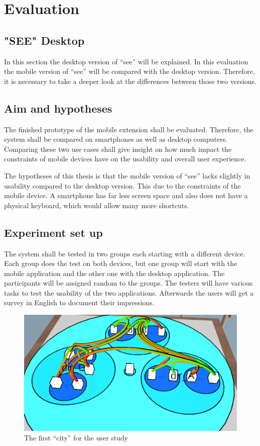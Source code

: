 \section{Evaluation}

\subsection{"SEE" Desktop}
In this section the desktop version of \enquote{\gls{see}} will be explained. 
In this evaluation the mobile version of \enquote{\gls{see}} will be compared with the desktop version.
Therefore, it is necessary to take a deeper look at the differences between those two versions.

\subsection{Aim and hypotheses}
The finished prototype of the mobile extension shall be evaluated. 
Therefore, the system shall be compared on smartphones as well as desktop computers. 
Comparing these two use cases shall give insight on how much impact the constraints of mobile devices have on the usability and overall user experience.

The hypotheses of this thesis is that the mobile version of \enquote{\gls{see}} lacks slightly in usability compared to the desktop version.
This due to the constraints of the mobile device. 
A smartphone has far less screen space and also does not have a physical keyboard, which would allow many more shortcuts.
\subsection{Experiment set up}

The system shall be tested in two groups each starting with a different device. 
Each group does the test on both devices, but one group will start with the mobile application and the other one with the desktop application.
The participants will be assigned random to the groups.
The testers will have various tasks to test the usability of the two applications. 
Afterwards the users will get a survey in English to document their impressions.
\begin{figure}[htb]
  \centering
  \includegraphics[width=1\textwidth]{Evaluation/img/city_1.png}
  \caption{The first \enquote{\gls{city}} for the user study}\label{fig:city1}
\end{figure}

